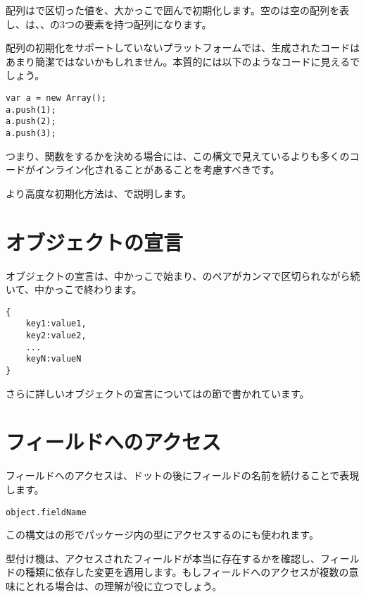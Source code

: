 配列は\expr{,}で区切った値を、大かっこ\expr{[]}で囲んで初期化します。空の\expr{[]}は空の配列を表し、\expr{[1, 2, 3]}は、、の3つの要素を持つ配列になります。

配列の初期化をサポートしていないプラットフォームでは、生成されたコードはあまり簡潔ではないかもしれません。本質的には以下のようなコードに見えるでしょう。

\begin{lstlisting}
var a = new Array();
a.push(1);
a.push(2);
a.push(3);
\end{lstlisting}

つまり、関数をするかを決める場合には、この構文で見えているよりも多くのコードがインライン化されることがあることを考慮すべきです。

より高度な初期化方法は、で説明します。

\section{オブジェクトの宣言}
\label{expression-object-declaration}

オブジェクトの宣言は、中かっこ\expr{\{}で始まり、のペアがカンマ\expr{,}で区切られながら続いて、中かっこ\expr{\}}で終わります。

\begin{lstlisting}
{
	key1:value1,
	key2:value2,
	...
	keyN:valueN
}
\end{lstlisting}
さらに詳しいオブジェクトの宣言についてはの節で書かれています。

\section{フィールドへのアクセス}
\label{expression-field-access}

フィールドへのアクセスは、ドットの後にフィールドの名前を続けることで表現します。

\begin{lstlisting}
object.fieldName
\end{lstlisting}

この構文はの形でパッケージ内の型にアクセスするのにも使われます。

型付け機は、アクセスされたフィールドが本当に存在するかを確認し、フィールドの種類に依存した変更を適用します。もしフィールドへのアクセスが複数の意味にとれる場合は、の理解が役に立つでしょう。

